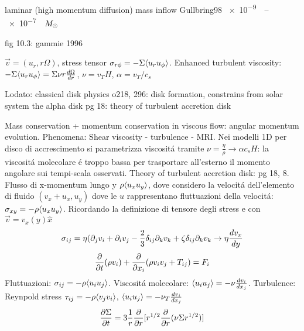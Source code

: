 \begin{workout}
laminar (high momentum diffusion)
mass inflow Gullbring98 \SIrange{e-9}{e-7}{\per\year}$\msun{}$
\end{workout}
\begin{workout}[MRI]
fig 10.3:
gammie 1996
\end{workout}

\begin{workout}
$\vec{v}=(u_r,r\Omega)$, stress tensor $\sigma_{r\phi}=-\Sigma\exv{u_ru_{\phi}}$.
Enhanced turbulent viscosity: $-\Sigma\exv{u_ru_{\phi}}=\Sigma\nu r\TDy{r}{\Omega}$, $\nu=v_TH$, $\alpha=v_T/c_s$
\end{workout}

\begin{workout}
Lodato: classical disk physics
o218, 296: disk formation, constrains from solar system
the alpha disk pg 18: theory of turbulent accretion disk
\end{workout}

\begin{workout}

\end{workout}

\begin{workout}
Mass conservation + momentum conservation in viscous flow: angular momentum evolution. Phenomena: Shear viscosity - turbulence - MRI.
Nei modelli 1D per disco di accrescimento si parametrizza viscosit\'a tramite $\nu=\frac{\eta}{\rho}\to\alpha c_s H$: la viscosit\'a molecolare \'e troppo bassa  per trasportare all'esterno il momento angolare sui tempi-scala osservati.
Theory of turbulent accretion disk: pg 18, 8.
Flusso di x-momentum lungo y $\rho\exv{u_xu_y}$, dove considero la velocit\'a dell'elemento di fluido $(v_x+u_x,u_y)$ dove le $u$ rappresentano fluttuazioni della velocit\'a: $\sigma_{xy}=-\rho\exv{u_xu_y}$.
Ricordando la definizione di tensore degli stress e con $\vec{v}=v_x(y)\hat{x}$
\begin{equation}
\sigma_{ij}=\eta(\partial_jv_i+\partial_iv_j-\frac{2}{3}\delta_{ij}\partial_kv_k+\zeta\delta_{ij}\partial_kv_k \to \eta\TDy{y}{v_x}
\end{equation}
\begin{equation}
\PDof{t}(\rho v_i)+\PDof{x_i}(\rho v_iv_j+T_{ij})=F_i
\end{equation}
Fluttuazioni: $\sigma_{ij}=-\rho\exv{u_iu_j}$.
Viscosit\'a molecolare: $\exv{u_iu_j}=-\nu\TDy{x_j}{v_i}$.
Turbulence: Reynpold stress $\tau_{ij}=-\rho\exv{v_jv_i}$, $\exv{u_iu_j}=-\nu_T\TDy{x_j}{v_i}$
\begin{equation}
\PDy{t}{\Sigma}=3\frac{1}{r}\PDof{r}[r\expy{1/2}\PDof{r}(\nu\Sigma r\expy{1/2})]
\end{equation}
\end{workout}

